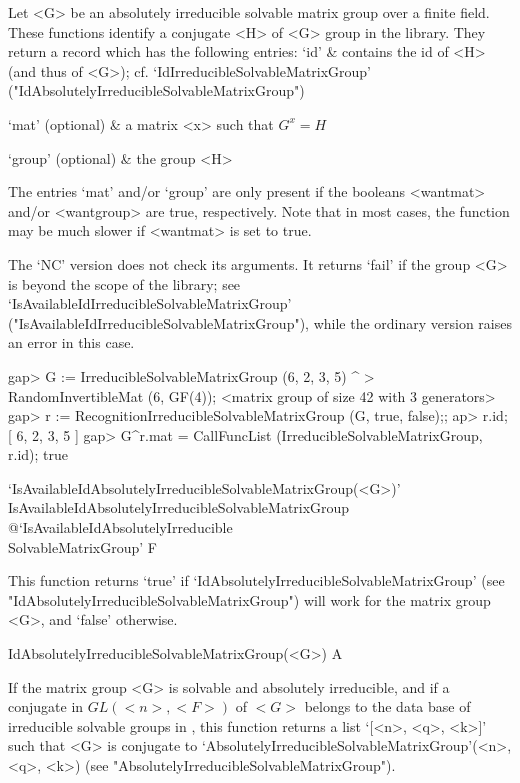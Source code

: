 Let <G> be an absolutely irreducible solvable matrix group over a finite field. 
These functions identify a conjugate <H> of <G> group in the library. 
They return a record which has the following entries:
\beginitems
`id' &  contains the id of <H> (and thus of
<G>); cf. `IdIrreducibleSolvableMatrixGroup'
("IdAbsolutelyIrreducibleSolvableMatrixGroup")

`mat' (optional) &
a
matrix <x> such that $G^x = H$

`group' (optional) & the group <H> 

\enditems
The entries `mat' and/or `group' are only present if the booleans <wantmat> and/or
<wantgroup> are true, respectively. Note that in most cases, the function may 
be much slower if <wantmat> is set to true.  

The `NC' version does not check its arguments. It returns `fail' if
the group <G> is beyond the scope of the {\IRREDSOL} library; see
`IsAvailableIdIrreducibleSolvableMatrixGroup'
("IsAvailableIdIrreducibleSolvableMatrixGroup"), while the
ordinary version raises an error in this case.

\beginexample
gap> G := IrreducibleSolvableMatrixGroup (6, 2, 3, 5) ^
>         RandomInvertibleMat (6, GF(4));
<matrix group of size 42 with 3 generators>
gap> r := RecognitionIrreducibleSolvableMatrixGroup (G, true, false);;
ap> r.id;
[ 6, 2, 3, 5 ]
gap> G^r.mat = CallFuncList (IrreducibleSolvableMatrixGroup, r.id);
true
\endexample



\>`IsAvailableIdAbsolutelyIrreducibleSolvableMatrixGroup(<G>)'%
{IsAvailableIdAbsolutelyIrreducibleSolvableMatrixGroup}%
@{`IsAvailableIdAbsolutelyIrreducible\\SolvableMatrixGroup'} F

This function returns `true' if `IdAbsolutelyIrreducibleSolvableMatrixGroup' (see
"IdAbsolutelyIrreducibleSolvableMatrixGroup") will work for the matrix group <G>, and `false' otherwise.

\>IdAbsolutelyIrreducibleSolvableMatrixGroup(<G>) A

If the matrix group <G> is solvable and absolutely irreducible, and if 
 a conjugate in
$GL(<n>, <F>)$ of $<G>$ belongs to the data base of  irreducible solvable groups in
{\IRREDSOL}, this function returns a list `[<n>, <q>, <k>]' such that <G> is
conjugate to  `AbsolutelyIrreducibleSolvableMatrixGroup'(<n>, <q>, <k>) (see
"AbsolutelyIrreducibleSolvableMatrixGroup").

